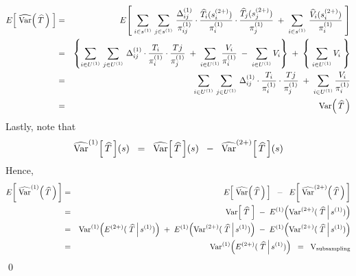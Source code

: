 \begin{eqnarray*}
E\!\left[\;\widehat{\textnormal{Var}}\!\left(\,\widehat{T}\,\right)\;\right]
&=&
E\!\left[\;
\sum_{i\in s^{(1)}}\,\sum_{j\in s^{(1)}}\,
\dfrac{\Delta^{(1)}_{ij}}{\pi^{(1)}_{ij}}
\cdot
\dfrac{\widehat{T}_{i}(s^{(2+)}_{i})}{\pi^{(1)}_{i}}
\cdot
\dfrac{\widehat{T}_{j}(s^{(2+)}_{j})}{\pi^{(1)}_{j}}
\;+\;
\sum_{i\in s^{(1)}}\,\dfrac{\widehat{V}_{i}(s^{(2+)}_{i})}{\pi^{(1)}_{i}}
\;\right]
\\
&=&
\left\{
\sum_{i \in U^{(1)}}\,\sum_{j \in U^{(1)}}\,
\Delta^{(1)}_{ij} \cdot \dfrac{T_{i}}{\pi^{(1)}_{i}} \cdot \dfrac{T{j}}{\pi^{(1)}_{j}}
\;+\;
\sum_{i \in U^{(1)}} \dfrac{V_{i}}{\pi^{(1)}_{i}}
\;-\;
\sum_{i \in U^{(1)}} V_{i}
\right\}
\;+\;
\left\{\;\sum_{i \in U^{(1)}} V_{i}\;\right\}
\\
&=&
\sum_{i \in U^{(1)}}\,\sum_{j \in U^{(1)}}\,
\Delta^{(1)}_{ij} \cdot \dfrac{T_{i}}{\pi^{(1)}_{i}} \cdot \dfrac{T{j}}{\pi^{(1)}_{j}}
\;+\;
\sum_{i \in U^{(1)}} \dfrac{V_{i}}{\pi^{(1)}_{i}}
\\
&=&
\textnormal{Var}\!\left(\,\widehat{T}\,\right)
\end{eqnarray*}
Lastly, note that
\begin{equation*}
\widehat{\textnormal{Var}}^{(1)}\!\left[\,\widehat{T}\,\right]\!(s)
\;\;=\;\;
\widehat{\textnormal{Var}}\!\left[\,\widehat{T}\,\right]\!(s)
\;\;-\;\;
\widehat{\textnormal{Var}}^{(2+)}\!\left[\,\widehat{T}\,\right]\!(s)
\end{equation*}
Hence,
\begin{eqnarray*}
E\!\left[\;
\widehat{\Var}^{(1)}\!\left(\,\widehat{T}\,\right)
\,\right]
&=&
E\!\left[\;\widehat{\Var}\!\left(\,\widehat{T}\,\right)\,\right]
\;\;-\;\;
E\!\left[\;\widehat{\Var}^{(2+)}\!\left(\,\widehat{T}\,\right)\,\right]
\\
&=&
\Var\!\left[\;\widehat{T}\;\right] \;-\; E^{(1)}\!\left(\Var^{(2+)}(\,\left.\widehat{T}\,\right\vert s^{(1)})\right)
\\
&=&
\Var^{(1)}\!\left(E^{(2+)}(\,\left.\widehat{T}\,\right\vert s^{(1)})\right)
\;+\;
E^{(1)}\!\left(\Var^{(2+)}(\,\left.\widehat{T}\,\right\vert s^{(1)})\right)
\;-\;
E^{(1)}\!\left(\Var^{(2+)}(\,\left.\widehat{T}\,\right\vert s^{(1)})\right)
\\
&=&
\Var^{(1)}\!\left(E^{(2+)}(\,\left.\widehat{T}\,\right\vert s^{(1)})\right)
\;\;=\;\;\textnormal{V}_{\textnormal{subsampling}}
\end{eqnarray*}
\qed


